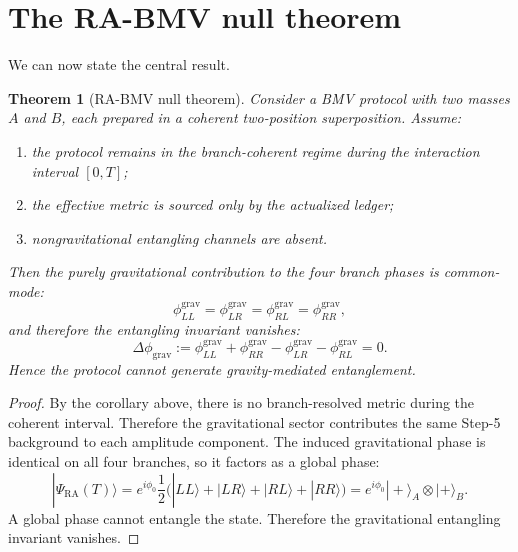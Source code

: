 \documentclass[11pt]{article}
\newtheorem{theorem}{Theorem}
\begin{document}
\section{The RA-BMV null theorem}

We can now state the central result.

\begin{theorem}[RA-BMV null theorem]
Consider a BMV protocol with two masses $A$ and $B$, each prepared in a coherent two-position superposition. Assume:
\begin{enumerate}[label=(\arabic*),leftmargin=2.5em]
    \item the protocol remains in the branch-coherent regime during the interaction interval $[0,T]$;
    \item the effective metric is sourced only by the actualized ledger;
    \item nongravitational entangling channels are absent.
\end{enumerate}
Then the purely gravitational contribution to the four branch phases is common-mode:
\begin{equation}
\phi^{\mathrm{grav}}_{LL}
=
\phi^{\mathrm{grav}}_{LR}
=
\phi^{\mathrm{grav}}_{RL}
=
\phi^{\mathrm{grav}}_{RR},
\end{equation}
and therefore the entangling invariant vanishes:
\begin{equation}
\Delta\phi_{\mathrm{grav}}
:=
\phi^{\mathrm{grav}}_{LL}
+
\phi^{\mathrm{grav}}_{RR}
-
\phi^{\mathrm{grav}}_{LR}
-
\phi^{\mathrm{grav}}_{RL}
=
0.
\end{equation}
Hence the protocol cannot generate gravity-mediated entanglement.
\end{theorem}

\begin{proof}
By the corollary above, there is no branch-resolved metric during the coherent interval. Therefore the gravitational sector contributes the same Step-5 background to each amplitude component. The induced gravitational phase is identical on all four branches, so it factors as a global phase:
\begin{equation}
|\Psi_{\mathrm{RA}}(T)\rangle
=
 e^{i\phi_0}
\frac{1}{2}\bigl(|LL\rangle + |LR\rangle + |RL\rangle + |RR\rangle\bigr)
=
 e^{i\phi_0}|+\rangle_A\otimes |+\rangle_B.
\end{equation}
A global phase cannot entangle the state. Therefore the gravitational entangling invariant vanishes. \qedhere
\end{proof}
\end{document}

